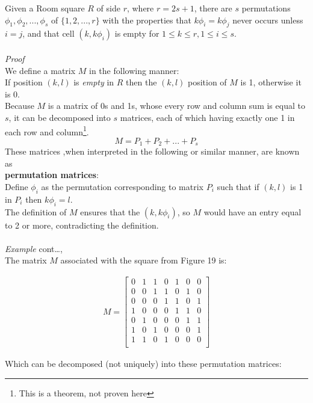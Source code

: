 \documentclass[
  12pt,
  a4paper]{book}
\begin{document}
Given a Room square \(R\) of side \(r\), where \(r=2s+1\), there are
\(s\) permutations \(\phi_1,\phi_2,...,\phi_s\) of \(\{1,2,...,r\}\)
with the properties that \(k\phi_i=k\phi_j\) never occurs unless
\(i=j\), and that cell \((k,k\phi_i)\) is empty for
\(1 \leq k \leq r, 1 \leq i\leq s\).\\
~\\
\emph{Proof}\\
We define a matrix \(M\) in the following manner:\\
If position \((k,l)\) is \emph{empty} in \(R\) then the \((k,l)\)
position of \(M\) is 1, otherwise it is 0.\\
Because \(M\) is a matrix of 0s and 1s, whose every row and column sum
is equal to \(s\), it can be decomposed into \(s\) matrices, each of
which having exactly one 1 in each row and column\footnote{This is a
  theorem, not proven here}. \[M=P_1+P_2+...+P_s\] These matrices ,when
interpreted in the following or similar manner, are known as\\
\textbf{permutation matrices}:\\
Define \(\phi_i\) as the permutation corresponding to matrix \(P_i\)
such that if \((k,l)\) is 1 in \(P_i\) then \(k\phi _i=l\).\\
The definition of \(M\) ensures that the \((k,k\phi _i)\), so \(M\)
would have an entry equal to 2 or more, contradicting the definition.\\
~\\
\emph{Example} cont\ldots,\\
The matrix \(M\) associated with the square from Figure 19 is:

\[\begin{gathered}
M=
  \begin{bmatrix}
  0 & 1 & 1 & 0 & 1 & 0 & 0\\
  0 & 0 & 1 & 1 & 0 & 1 & 0\\
  0 & 0 & 0 & 1 & 1 & 0 & 1\\
  1 & 0 & 0 & 0 & 1 & 1 & 0\\
  0 & 1 & 0 & 0 & 0 & 1 & 1\\
  1 & 0 & 1 & 0 & 0 & 0 & 1\\
  1 & 1 & 0 & 1 & 0 & 0 & 0\\
  \end{bmatrix}\end{gathered}\]

Which can be decomposed (not uniquely) into these permutation matrices:
\end{document}
